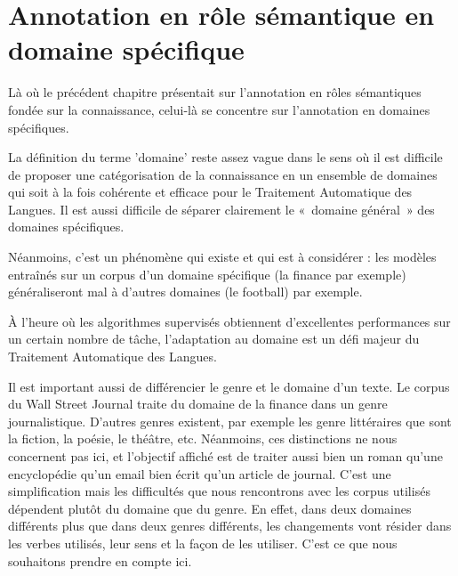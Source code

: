 \chapter{Annotation en rôle sémantique en domaine spécifique}
\label{ch:domainsrl}



Là où le précédent chapitre présentait sur l'annotation en rôles sémantiques
fondée sur la connaissance, celui-là se concentre sur l'annotation en domaines
spécifiques.

La définition du terme 'domaine' reste assez vague dans le sens où il est
difficile de proposer une catégorisation de la connaissance en un ensemble de
domaines qui soit à la fois cohérente et efficace pour le Traitement Automatique
des Langues. Il est aussi difficile de séparer clairement le «~domaine
général~» des domaines spécifiques.


Néanmoins, c'est un phénomène qui existe et qui est à considérer : les modèles
entraînés sur un corpus d'un domaine spécifique (la finance par exemple)
généraliseront mal à d'autres domaines (le football) par exemple. %

À l'heure où les algorithmes supervisés obtiennent d'excellentes performances
sur un certain nombre de tâche, l'adaptation au domaine est un défi majeur du
Traitement Automatique des Langues.

Il est important aussi de différencier le genre et le domaine d'un texte. Le
corpus du Wall Street Journal traite du domaine de la finance dans un genre
journalistique. D'autres genres existent, par exemple les genre littéraires que
sont la fiction, la poésie, le théâtre, etc. Néanmoins, ces distinctions ne
nous concernent pas ici, et l'objectif affiché est de traiter aussi bien un
roman qu'une encyclopédie qu'un email bien écrit qu'un article de journal.
C'est une simplification mais les difficultés que nous rencontrons avec les
corpus utilisés dépendent plutôt du domaine que du genre. En effet, dans deux
domaines différents plus que dans deux genres différents, les changements vont
résider dans les verbes utilisés, leur sens et la façon de les utiliser. C'est
ce que nous souhaitons prendre en compte ici.

